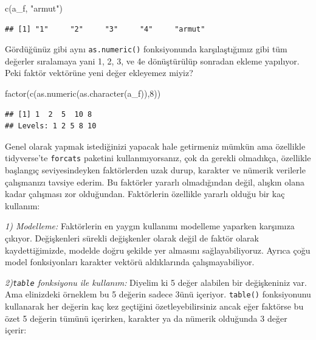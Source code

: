 \documentclass[
]{book}
\newenvironment{Shaded}{\begin{snugshade}}{\end{snugshade}}
\newcommand{\DecValTok}[1]{\textcolor[rgb]{0.00,0.00,0.81}{#1}}
\newcommand{\FunctionTok}[1]{\textcolor[rgb]{0.00,0.00,0.00}{#1}}
\newcommand{\NormalTok}[1]{#1}
\newcommand{\StringTok}[1]{\textcolor[rgb]{0.31,0.60,0.02}{#1}}
\begin{document}
\begin{Shaded}
\begin{Highlighting}[]
\FunctionTok{c}\NormalTok{(a\_f, }\StringTok{"armut"}\NormalTok{)}
\end{Highlighting}
\end{Shaded}

\begin{verbatim}
## [1] "1"     "2"     "3"     "4"     "armut"
\end{verbatim}

Gördüğünüz gibi aynı \texttt{as.numeric()} fonksiyonunda karşılaştığımız gibi tüm değerler sıralamaya yani 1, 2, 3, ve 4e dönüştürülüp sonradan ekleme yapılıyor. Peki faktör vektörüne yeni değer ekleyemez miyiz?

\begin{Shaded}
\begin{Highlighting}[]
\FunctionTok{factor}\NormalTok{(}\FunctionTok{c}\NormalTok{(}\FunctionTok{as.numeric}\NormalTok{(}\FunctionTok{as.character}\NormalTok{(a\_f)),}\DecValTok{8}\NormalTok{))}
\end{Highlighting}
\end{Shaded}

\begin{verbatim}
## [1] 1  2  5  10 8 
## Levels: 1 2 5 8 10
\end{verbatim}

Genel olarak yapmak istediğinizi yapacak hale getirmeniz mümkün ama özellikle tidyverse'te \texttt{forcats} paketini kullanmıyorsanız, çok da gerekli olmadıkça, özellikle başlangıç seviyesindeyken faktörlerden uzak durup, karakter ve nümerik verilerle çalışmanızı tavsiye ederim. Bu faktörler yararlı olmadığından değil, alışkın olana kadar çalışması zor olduğundan. Faktörlerin özellikle yararlı olduğu bir kaç kullanım:

\emph{1) Modelleme:} Faktörlerin en yaygın kullanımı modelleme yaparken karşımıza çıkıyor. Değişkenleri sürekli değişkenler olarak değil de faktör olarak kaydettiğimizde, modelde doğru şekilde yer almasını sağlayabiliyoruz. Ayrıca çoğu model fonksiyonları karakter vektörü aldıklarında çalışmayabiliyor.

\emph{2)\texttt{table} fonksiyonu ile kullanım:} Diyelim ki 5 değer alabilen bir değişkeniniz var. Ama elinizdeki örneklem bu 5 değerin sadece 3ünü içeriyor. \texttt{table()} fonksiyonunu kullanarak her değerin kaç kez geçtiğini özetleyebilirsiniz ancak eğer faktörse bu özet 5 değerin tümünü içerirken, karakter ya da nümerik olduğunda 3 değer içerir:
\end{document}
